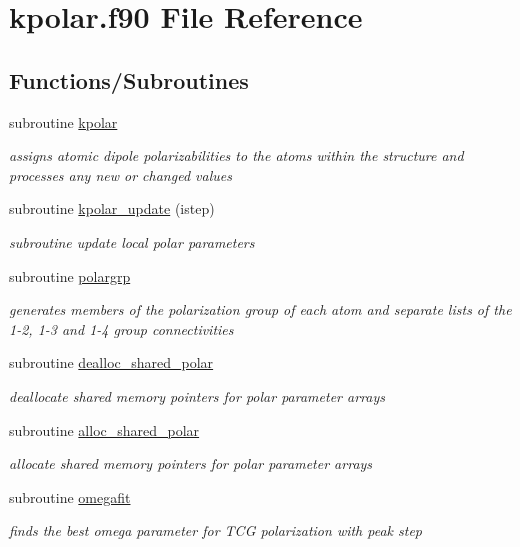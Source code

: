 \hypertarget{kpolar_8f90}{\section{kpolar.\-f90 File Reference}
\label{kpolar_8f90}
}
\subsection*{Functions/\-Subroutines}
\begin{DoxyCompactItemize}
\item 
subroutine \hyperlink{kpolar_8f90_a5675fdfc94b9192a3362d602ebf89053}{kpolar}
\begin{DoxyCompactList}\small\item\em assigns atomic dipole polarizabilities to the atoms within the structure and processes any new or changed values \end{DoxyCompactList}\item 
subroutine \hyperlink{kpolar_8f90_a980c06bee05e0f583df9794278c5cac8}{kpolar\-\_\-update} (istep)
\begin{DoxyCompactList}\small\item\em subroutine update local polar parameters \end{DoxyCompactList}\item 
subroutine \hyperlink{kpolar_8f90_a03d6e12672716c7e6be7227f66809779}{polargrp}
\begin{DoxyCompactList}\small\item\em generates members of the polarization group of each atom and separate lists of the 1-\/2, 1-\/3 and 1-\/4 group connectivities \end{DoxyCompactList}\item 
subroutine \hyperlink{kpolar_8f90_a2cc59daf2f863e63dfc3bb6362c1e719}{dealloc\-\_\-shared\-\_\-polar}
\begin{DoxyCompactList}\small\item\em deallocate shared memory pointers for polar parameter arrays \end{DoxyCompactList}\item 
subroutine \hyperlink{kpolar_8f90_a4f7f43d1c8a11695a6114a61192d3027}{alloc\-\_\-shared\-\_\-polar}
\begin{DoxyCompactList}\small\item\em allocate shared memory pointers for polar parameter arrays \end{DoxyCompactList}\item 
subroutine \hyperlink{kpolar_8f90_a6d6cbf00b0d96b9ab6f2194e7277a933}{omegafit}
\begin{DoxyCompactList}\small\item\em finds the best omega parameter for T\-C\-G polarization with peak step \end{DoxyCompactList}\end{DoxyCompactItemize}


